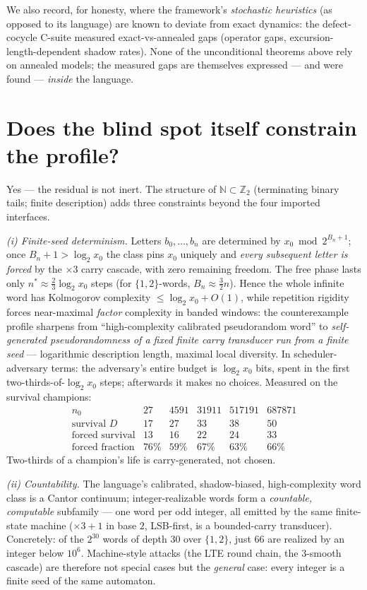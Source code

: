 \documentclass[11pt]{article}
\newcommand{\Ztwo}{\mathbb Z_2}
\begin{document}
We also record, for honesty, where the framework's \emph{stochastic
heuristics} (as opposed to its language) are known to deviate from
exact dynamics: the defect-cocycle C-suite measured exact-vs-annealed
gaps (operator gaps, excursion-length-dependent shadow rates). None
of the unconditional theorems above rely on annealed models; the
measured gaps are themselves expressed --- and were found ---
\emph{inside} the language.

\section{Does the blind spot itself constrain the profile?}

Yes --- the residual is not inert. The structure of
$\mathbb N\subset\Ztwo$ (terminating binary tails; finite description)
adds three constraints beyond the four imported interfaces.

\emph{(i) Finite-seed determinism.} Letters $b_0,\dots,b_n$ are
determined by $x_0\bmod2^{B_n+1}$; once $B_n+1>\log_2x_0$ the class
pins $x_0$ uniquely and \emph{every subsequent letter is forced} by
the $\times3$ carry cascade, with zero remaining freedom. The free
phase lasts only $n^*\approx\tfrac23\log_2x_0$ steps (for
$\{1,2\}$-words, $B_n\approx\tfrac32n$). Hence the whole infinite word
has Kolmogorov complexity $\le\log_2x_0+O(1)$, while repetition
rigidity forces near-maximal \emph{factor} complexity in banded
windows: the counterexample profile sharpens from ``high-complexity
calibrated pseudorandom word'' to \emph{self-generated pseudorandomness
of a fixed finite carry transducer run from a finite seed} ---
logarithmic description length, maximal local diversity. In
scheduler-adversary terms: the adversary's entire budget is
$\log_2x_0$ bits, spent in the first two-thirds-of-$\log_2x_0$ steps;
afterwards it makes no choices. Measured on the survival champions:
\[
\begin{array}{r|ccccc}
n_0 & 27 & 4591 & 31911 & 517191 & 687871\\
\hline
\text{survival }D & 17 & 27 & 33 & 38 & 50\\
\text{forced survival} & 13 & 16 & 22 & 24 & 33\\
\text{forced fraction} & 76\% & 59\% & 67\% & 63\% & 66\%
\end{array}
\]
Two-thirds of a champion's life is carry-generated, not chosen.

\emph{(ii) Countability.} The language's calibrated, shadow-biased,
high-complexity word class is a Cantor continuum; integer-realizable
words form a \emph{countable, computable} subfamily --- one word per
odd integer, all emitted by the same finite-state machine
($\times3{+}1$ in base $2$, LSB-first, is a bounded-carry transducer).
Concretely: of the $2^{30}$ words of depth $30$ over $\{1,2\}$, just
$66$ are realized by an integer below $10^6$. Machine-style attacks
(the LTE round chain, the $3$-smooth cascade) are therefore not
special cases but the \emph{general} case: every integer is a finite
seed of the same automaton.
\end{document}
